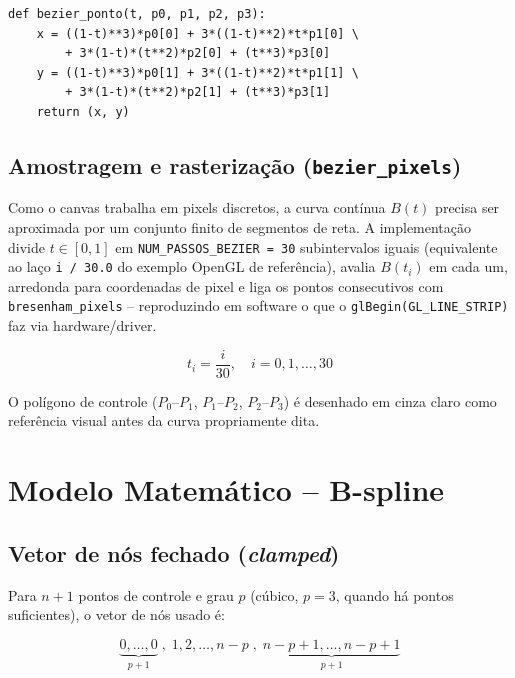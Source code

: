 \documentclass[11pt,a4paper]{article}
\begin{document}
\begin{lstlisting}[caption={Avaliação da curva de Bézier}]
def bezier_ponto(t, p0, p1, p2, p3):
    x = ((1-t)**3)*p0[0] + 3*((1-t)**2)*t*p1[0] \
        + 3*(1-t)*(t**2)*p2[0] + (t**3)*p3[0]
    y = ((1-t)**3)*p0[1] + 3*((1-t)**2)*t*p1[1] \
        + 3*(1-t)*(t**2)*p2[1] + (t**3)*p3[1]
    return (x, y)
\end{lstlisting}

\subsection{Amostragem e rasterização (\texttt{bezier\_pixels})}

Como o canvas trabalha em pixels discretos, a curva contínua $B(t)$ precisa
ser aproximada por um conjunto finito de segmentos de reta. A implementação
divide $t \in [0,1]$ em \texttt{NUM\_PASSOS\_BEZIER = 30} subintervalos iguais
(equivalente ao laço \texttt{i / 30.0} do exemplo OpenGL de referência),
avalia $B(t_i)$ em cada um, arredonda para coordenadas de pixel e liga os
pontos consecutivos com \texttt{bresenham\_pixels} -- reproduzindo em software
o que o \texttt{glBegin(GL\_LINE\_STRIP)} faz via hardware/driver.

\begin{equation}
t_i = \frac{i}{30}, \quad i = 0,1,\dots,30
\end{equation}

O polígono de controle ($P_0$--$P_1$, $P_1$--$P_2$, $P_2$--$P_3$) é desenhado
em cinza claro como referência visual antes da curva propriamente dita.


\section{Modelo Matemático -- B-spline}

\subsection{Vetor de nós fechado (\textit{clamped})}

Para $n+1$ pontos de controle e grau $p$ (cúbico, $p=3$, quando há pontos
suficientes), o vetor de nós usado é:

\begin{equation}
\underbrace{0,\dots,0}_{p+1} \;,\; 1, 2, \dots, n-p \;,\; \underbrace{n-p+1,\dots,n-p+1}_{p+1}
\end{equation}
\end{document}
